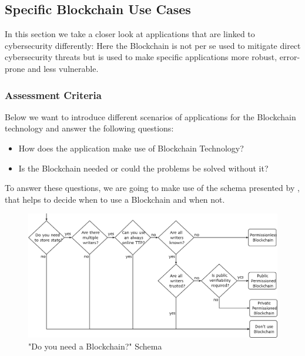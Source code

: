 \subsection{Specific Blockchain Use Cases}
\label{subsec:03_applications}

In this section we take a closer look at applications that are linked to cybersecurity differently: Here the Blockchain is not per se used to mitigate direct cybersecurity threats but is used to make specific applications more robust, error-prone and less vulnerable.

\subsubsection{Assessment Criteria}
Below we want to introduce different scenarios of applications for the Blockchain technology and answer the following questions:
\begin{itemize}
    \item How does the application make use of Blockchain Technology?
    \item Is the Blockchain needed or could the problems be solved without it?
\end{itemize}
To answer these questions, we are going to make use of the schema presented by \cite{Wust2017}, that helps to decide when to use a Blockchain and when not.
\begin{figure}[ht!]
    \begin{center}
        \includegraphics[scale=0.6]{Talk7/img/app/BCorNot}
    \end{center}
    \caption{"Do you need a Blockchain?" Schema \cite{Wust2017}}
    \label{fig:Blockchain_or_not}
\end{figure}

